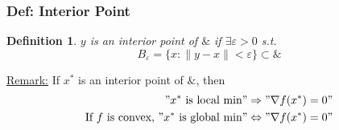 \documentclass[11pt,a4paper]{article}
\newtheorem{definition}{Definition}
\begin{document}
\subsubsection{Def: Interior Point}
\begin{definition}
    $y$ is an interior point of $\&$ if $\exists \varepsilon>0$ s.t. $$B_{\varepsilon}=\{x:\|y-x\|<\varepsilon\}\subset\&$$
\end{definition}
\underline{Remark:} If $x^*$ is an interior point of $\&$, then
\begin{equation}
    \begin{aligned}
        "x^*\text{ is local min}"&\Rightarrow	"\nabla f(x^*)=0"\\
        \text{If }f\text{ is convex, }"x^*\text{ is global min}"&\Leftrightarrow "\nabla f(x^*)=0"\\
    \end{aligned}
    \nonumber
\end{equation}
\end{document}
